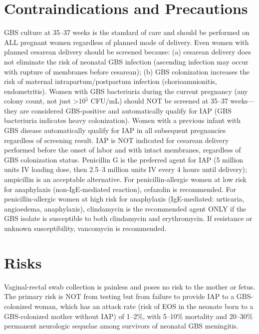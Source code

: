 \section*{Contraindications and Precautions}
GBS culture at 35--37 weeks is the standard of care and should be performed on ALL pregnant women regardless of planned mode of delivery. Even women with planned cesarean delivery should be screened because: (a) cesarean delivery does not eliminate the risk of neonatal GBS infection (ascending infection may occur with rupture of membranes before cesarean); (b) GBS colonization increases the risk of maternal intrapartum/postpartum infection (chorioamnionitis, endometritis). Women with GBS bacteriuria during the current pregnancy (any colony count, not just >10$^5$ CFU/mL) should NOT be screened at 35--37 weeks---they are considered GBS-positive and automatically qualify for IAP (GBS bacteriuria indicates heavy colonization). Women with a previous infant with GBS disease automatically qualify for IAP in all subsequent pregnancies regardless of screening result. IAP is NOT indicated for cesarean delivery performed before the onset of labor and with intact membranes, regardless of GBS colonization status. Penicillin G is the preferred agent for IAP (5 million units IV loading dose, then 2.5--3 million units IV every 4 hours until delivery); ampicillin is an acceptable alternative. For penicillin-allergic women at low risk for anaphylaxis (non-IgE-mediated reaction), cefazolin is recommended. For penicillin-allergic women at high risk for anaphylaxis (IgE-mediated: urticaria, angioedema, anaphylaxis), clindamycin is the recommended agent ONLY if the GBS isolate is susceptible to both clindamycin and erythromycin. If resistance or unknown susceptibility, vancomycin is recommended.

\section*{Risks}
Vaginal-rectal swab collection is painless and poses no risk to the mother or fetus. The primary risk is NOT from testing but from failure to provide IAP to a GBS-colonized woman, which has an attack rate (risk of EOS in the neonate born to a GBS-colonized mother without IAP) of 1--2\%, with 5--10\% mortality and 20--30\% permanent neurologic sequelae among survivors of neonatal GBS meningitis.

